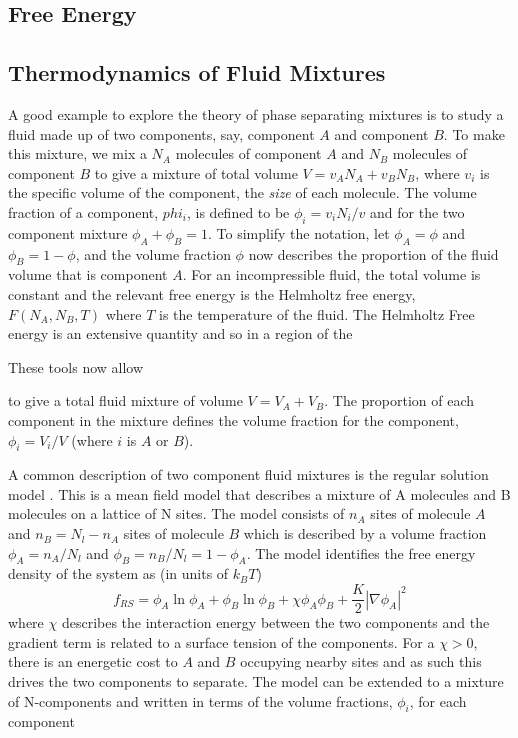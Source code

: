 \subsection{Free Energy}
\subsection{Thermodynamics of Fluid Mixtures}

A good example to explore the theory of phase separating mixtures is to study a fluid made up of two components, say, component $A$ and component $B$. To make this mixture, we mix a $N_A$ molecules of component $A$ and $N_B$ molecules of component $B$ to give a mixture of total volume $V = v_A N_A + v_B N_B$, where $v_i$ is the specific volume of the component, the \textit{size} of each molecule. The volume fraction of a component, $phi_i$, is defined to be $\phi_i = v_i N_i/v$ and for the two component mixture $\phi_A+\phi_B = 1$. To simplify the notation, let $\phi_A=\phi$ and $\phi_B=1-\phi$, and the volume fraction $\phi$ now describes the proportion of the fluid volume that is component $A$. For an incompressible fluid, the total volume is constant and the relevant free energy is the Helmholtz free energy, $F(N_A, N_B, T)$ where $T$ is the temperature of the fluid. The Helmholtz Free energy is an extensive quantity and so in a region of the 

These tools now allow 


to give a total fluid mixture of volume $V=V_A + V_B$. The proportion of each component in the mixture defines the volume fraction for the component, $\phi_i = V_i/V$ (where $i$ is $A$ or $B$).

A common description of two component fluid mixtures is the regular solution model \cite{jones2002soft}. This is a mean field model that describes a mixture of A molecules and B molecules on a lattice of N sites. The model consists of $n_A$ sites of molecule $A$ and $n_B=N_l-n_A$ sites of molecule $B$ which is described by a volume fraction $\phi_A = n_A/N_l$ and $\phi_B = n_B/N_l = 1-\phi_A$. The model identifies the free energy density of the system as (in units of $k_BT$)
\begin{equation}
    f_{RS} = \phi_A\ln\phi_A+\phi_B\ln\phi_B + \chi\phi_A\phi_B + \frac{K}{2}|\nabla\phi_A|^2
\end{equation}
where $\chi$ describes the interaction energy between the two components and the gradient term is related to a surface tension of the components. For a $\chi > 0$, there is an energetic cost to $A$ and $B$ occupying nearby sites and as such this drives the two components to separate. The model can be extended to a mixture of N-components and written in terms of the volume fractions, $\phi_i$, for each component

